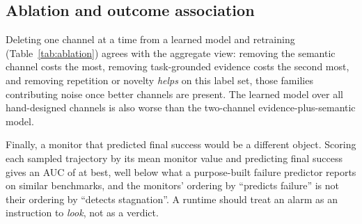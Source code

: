 \subsection{Ablation and outcome association}
\label{sec:res-ablation}
Deleting one channel at a time from a learned model and retraining (Table~\ref{tab:ablation}) agrees with
the aggregate view: removing the semantic channel costs the most, removing task-grounded evidence costs the
second most, and removing repetition or novelty \emph{helps} on this label set, those families contributing
noise once better channels are present. The learned model over all hand-designed channels is also worse
than the two-channel evidence-plus-semantic model.

Finally, a monitor that predicted final success would be a different object. Scoring each sampled
trajectory by its mean monitor value and predicting final success gives an AUC of \poutcomeAssocBestAuc{}
at best, well below what a purpose-built failure predictor reports on similar benchmarks, and the
monitors' ordering by ``predicts failure'' is not their ordering by ``detects stagnation''. A runtime
should treat an alarm as an instruction to \emph{look}, not as a verdict.
